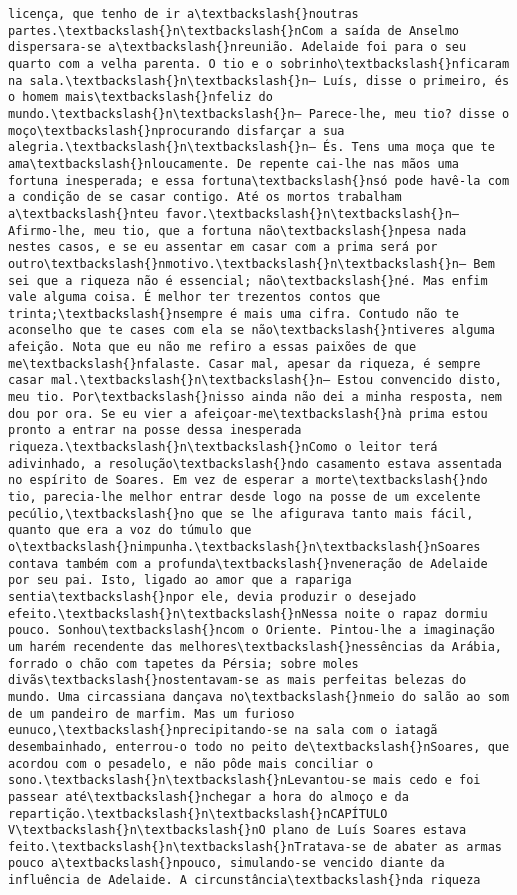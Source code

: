 \begin{Verbatim}[commandchars=\\\{\}]
licença, que tenho de ir a\textbackslash{}noutras partes.\textbackslash{}n\textbackslash{}nCom a saída de Anselmo dispersara-se a\textbackslash{}nreunião. Adelaide foi para o seu quarto com a velha parenta. O tio e o sobrinho\textbackslash{}nficaram na sala.\textbackslash{}n\textbackslash{}n— Luís, disse o primeiro, és o homem mais\textbackslash{}nfeliz do mundo.\textbackslash{}n\textbackslash{}n— Parece-lhe, meu tio? disse o moço\textbackslash{}nprocurando disfarçar a sua alegria.\textbackslash{}n\textbackslash{}n— És. Tens uma moça que te ama\textbackslash{}nloucamente. De repente cai-lhe nas mãos uma fortuna inesperada; e essa fortuna\textbackslash{}nsó pode havê-la com a condição de se casar contigo. Até os mortos trabalham a\textbackslash{}nteu favor.\textbackslash{}n\textbackslash{}n— Afirmo-lhe, meu tio, que a fortuna não\textbackslash{}npesa nada nestes casos, e se eu assentar em casar com a prima será por outro\textbackslash{}nmotivo.\textbackslash{}n\textbackslash{}n— Bem sei que a riqueza não é essencial; não\textbackslash{}né. Mas enfim vale alguma coisa. É melhor ter trezentos contos que trinta;\textbackslash{}nsempre é mais uma cifra. Contudo não te aconselho que te cases com ela se não\textbackslash{}ntiveres alguma afeição. Nota que eu não me refiro a essas paixões de que me\textbackslash{}nfalaste. Casar mal, apesar da riqueza, é sempre casar mal.\textbackslash{}n\textbackslash{}n— Estou convencido disto, meu tio. Por\textbackslash{}nisso ainda não dei a minha resposta, nem dou por ora. Se eu vier a afeiçoar-me\textbackslash{}nà prima estou pronto a entrar na posse dessa inesperada riqueza.\textbackslash{}n\textbackslash{}nComo o leitor terá adivinhado, a resolução\textbackslash{}ndo casamento estava assentada no espírito de Soares. Em vez de esperar a morte\textbackslash{}ndo tio, parecia-lhe melhor entrar desde logo na posse de um excelente pecúlio,\textbackslash{}no que se lhe afigurava tanto mais fácil, quanto que era a voz do túmulo que o\textbackslash{}nimpunha.\textbackslash{}n\textbackslash{}nSoares contava também com a profunda\textbackslash{}nveneração de Adelaide por seu pai. Isto, ligado ao amor que a rapariga sentia\textbackslash{}npor ele, devia produzir o desejado efeito.\textbackslash{}n\textbackslash{}nNessa noite o rapaz dormiu pouco. Sonhou\textbackslash{}ncom o Oriente. Pintou-lhe a imaginação um harém recendente das melhores\textbackslash{}nessências da Arábia, forrado o chão com tapetes da Pérsia; sobre moles divãs\textbackslash{}nostentavam-se as mais perfeitas belezas do mundo. Uma circassiana dançava no\textbackslash{}nmeio do salão ao som de um pandeiro de marfim. Mas um furioso eunuco,\textbackslash{}nprecipitando-se na sala com o iatagã desembainhado, enterrou-o todo no peito de\textbackslash{}nSoares, que acordou com o pesadelo, e não pôde mais conciliar o sono.\textbackslash{}n\textbackslash{}nLevantou-se mais cedo e foi passear até\textbackslash{}nchegar a hora do almoço e da repartição.\textbackslash{}n\textbackslash{}nCAPÍTULO V\textbackslash{}n\textbackslash{}nO plano de Luís Soares estava feito.\textbackslash{}n\textbackslash{}nTratava-se de abater as armas pouco a\textbackslash{}npouco, simulando-se vencido diante da influência de Adelaide. A circunstância\textbackslash{}nda riqueza 
\end{Verbatim}
